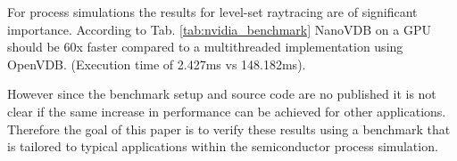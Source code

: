 For process simulations the results for level-set raytracing are of significant importance.
According to Tab. \ref{tab:nvidia_benchmark} NanoVDB on a GPU should be 60x faster compared to a multithreaded implementation using OpenVDB. (Execution time of 2.427ms vs 148.182ms).

However since the benchmark setup and source code are no published it is not clear if the same increase in performance can be achieved for other applications.
Therefore the goal of this paper is to verify these results using a benchmark that is tailored to typical applications within the semiconductor process simulation.

